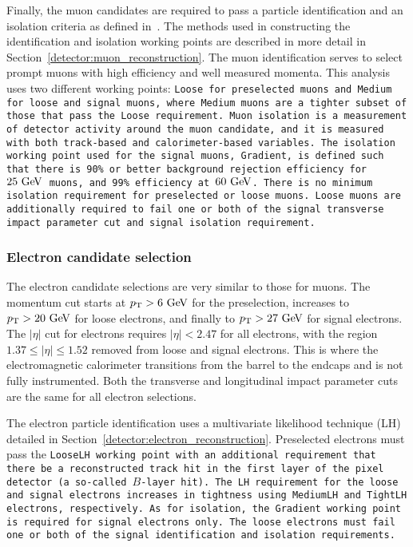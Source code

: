 Finally, the muon candidates are required to pass a particle identification and an isolation criteria as defined in~\cite{2016.muon-reconstruction-13tev}.
The methods used in constructing the identification and isolation working points are described in more detail in Section~\ref{detector:muon_reconstruction}.
The muon identification serves to select prompt muons with high efficiency and well measured momenta. %
This analysis uses two different working points: \tt{Loose} for preselected muons and \tt{Medium} for loose and signal muons, where \tt{Medium} muons are a tighter subset of those that pass the \tt{Loose} requirement.
Muon isolation is a measurement of detector activity around the muon candidate, and it is measured with both track-based and calorimeter-based variables.
The isolation working point used for the signal muons, \tt{Gradient}, is defined such that there is 90\% or better background rejection efficiency for $25\gev$ muons, and 99\% efficiency at $60\gev$.
There is no minimum isolation requirement for preselected or loose muons.
Loose muons are additionally required to fail one or both of the signal transverse impact parameter cut and signal isolation requirement.



\subsubsection{Electron candidate selection}
The electron candidate selections are very similar to those for muons.
The momentum cut starts at $\pt > 6\gev$ for the preselection, increases to $\pt > 20\gev$ for loose electrons, and finally to $\pt > 27\gev$ for signal electrons.
The $|\eta|$ cut for electrons requires $|\eta| < 2.47$ for all electrons, with the region $1.37 \le |\eta| \le 1.52$ removed from loose and signal electrons.
This is where the electromagnetic calorimeter transitions from the barrel to the endcaps and is not fully instrumented.
Both the transverse and longitudinal impact parameter cuts are the same for all electron selections.

The electron particle identification uses a multivariate likelihood technique (LH) detailed in Section~\ref{detector:electron_reconstruction}.
Preselected electrons must pass the \tt{LooseLH} working point with an additional requirement that there be a reconstructed track hit in the first layer of the pixel detector (a so-called $B$-layer hit).
The LH requirement for the loose and signal electrons increases in tightness using \tt{MediumLH} and \tt{TightLH} electrons, respectively.
As for isolation, the \tt{Gradient} working point is required for signal electrons only.
The loose electrons must fail one or both of the signal identification and isolation requirements.

